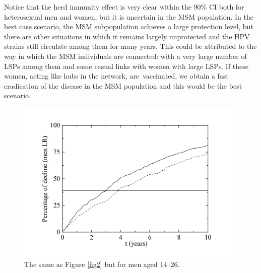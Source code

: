 Notice that the herd immunity effect is very clear within the $90\%$ CI both for heterosexual men and women, but it is uncertain in the MSM population. In the best case scenario, the MSM subpopulation achieves a large protection level, but there are other situations in which it remains largely unprotected and the HPV strains still circulate among them for many years. This could be attributed to the way in which the MSM individuals are connected: with a very large number of LSPs among them and some casual links with women with large LSPs. If these women, acting like hubs in the network, are~vaccinated, we obtain a fast eradication of the disease in the MSM population and this would be the best scenario.

\begin{figure}[H]
	\centering
	\includegraphics[scale=0.4]{DeclinemenLR.pdf}
	\vspace{-12pt}
	\caption{The same as Figure \protect\ref{fig2} but for men aged 14--26.}
	\label{fig3}
\end{figure}
\vspace{-30pt}


